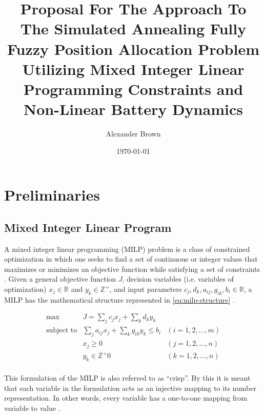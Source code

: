 \documentclass[11pt,a4paper,final]{article}
\author{Alexander Brown}
\date{\today}
\title{Proposal For The Approach To The Simulated Annealing Fully Fuzzy Position Allocation Problem Utilizing Mixed Integer Linear Programming Constraints and Non-Linear Battery Dynamics}
\begin{document}
\maketitle
\tableofcontents

\parskip 3mm                                %
\let\ref\autoref                            %

\let\ref\autoref                            %

\section{Preliminaries}
\label{sec:preliminaries}
\subsection{Mixed Integer Linear Program}
\label{sec:org49a06fe}
A mixed integer linear programming (MILP) problem is a class of constrained optimization in which one seeks to find a
set of continuous or integer values that maximizes or minimizes an objective function while satisfying a set of
constraints \cite{chen-2010-applied}. Given a general objective function \(J\), decision variables (i.e. variables of
optimization) \(x_j \in \mathbb{R}\) and \(y_k \in \mathbb{Z}^+\), and input parameters \(c_j, d_k, a_{ij}, g_{ik}, b_i \in \mathbb{R}\), a MILP has the
mathematical structure represented in \ref{eq:milp-structure} \cite{chen-2010-applied}.

\begin{equation}
\label{eq:milp-structure}
\begin{array}{lll}
\text{max}   & J = \sum_j c_j x_j + \sum_k d_k y_k            &                 \\
\text{subject to} & \sum_j a_{ij} x_j + \sum_k g_{ik} y_k  \le b_i & (i = 1,2,...,m) \\
                  & x_j \ge 0                                      & (j = 1,2,...,n) \\
                  & y_k \in \mathbb{Z^+}0                          & (k = 1,2,...,n) \\
\end{array}
\end{equation}

This formulation of the MILP is also referred to as ``crisp''. By this it is meant that each variable in the formulation
acts as an injective mapping to its number representation. In other words, every variable has a one-to-one mapping from
variable to value \cite{kaur-2016-introd-fuzzy}.
\end{document}
